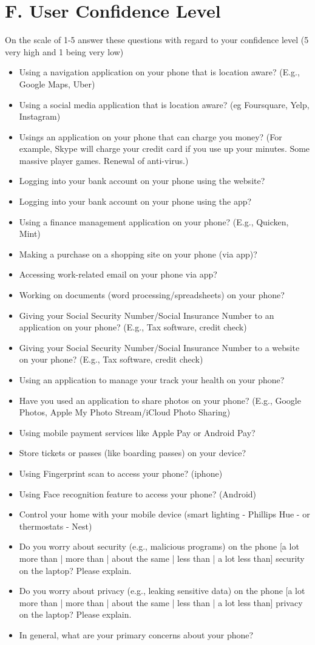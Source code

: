 \documentclass{sigchi}
\begin{document}
\section{F. User Confidence Level}
On the scale of 1-5 answer these questions with regard to your confidence level (5 very high and 1 being very low)
\begin{itemize}
\item Using a navigation application on your phone that is location aware? (E.g., Google Maps, Uber)
\item Using a social media application that is location aware? (eg Foursquare, Yelp, Instagram)
\item Usings an application on your phone that can charge you money? (For example, Skype will charge your credit card if you use up your minutes. Some massive player games. Renewal of anti-virus.)
\item Logging into your bank account on your phone using the website?
\item Logging into your bank account on your phone using the app?
\item Using a finance management application on your phone? (E.g., Quicken, Mint)
\item Making a purchase on a shopping site on your phone (via app)?
\item Accessing work-related email on your phone via app?
\item Working on documents (word processing/spreadsheets) on your phone?
\item Giving your Social Security Number/Social Insurance Number  to an application on your phone? (E.g., Tax software, credit check)
\item Giving your Social Security Number/Social Insurance Number  to a website on your phone? (E.g., Tax software, credit check)
\item Using an application to manage your track your health on your phone?
\item Have you used an application to share photos on your phone? (E.g., Google Photos, Apple My Photo Stream/iCloud Photo Sharing)
\item Using mobile payment services like Apple Pay or Android Pay?
\item Store tickets or passes (like boarding passes) on your device?
\item Using Fingerprint scan to access your phone? (iphone)
\item Using Face recognition feature to access your phone? (Android)
\item Control your home with your mobile device (smart lighting - Phillips Hue -  or thermostats - Nest)
\item Do you worry about security (e.g., malicious programs) on the phone [a lot more than | more than | about the same | less than | a lot less than] security on the laptop? Please explain.
\item Do you worry about privacy (e.g., leaking sensitive data) on the phone [a lot more than | more than | about the same | less than | a lot less than] privacy on the laptop? Please explain.
\item In general, what are your primary concerns about your phone?
\end{itemize}
\end{document}
